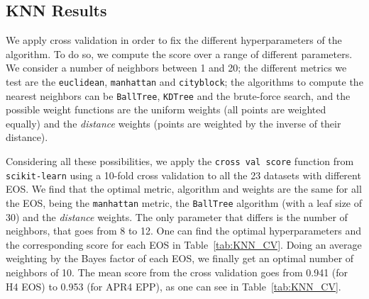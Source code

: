 \subsection{KNN Results}

We apply cross validation in order to fix the different hyperparameters of the algorithm.  To do so, we compute the score over a range of different parameters. We consider a number of neighbors between 1 and 20; the different metrics we test are the \texttt{euclidean}, \texttt{manhattan} and \texttt{cityblock}; the algorithms to compute the nearest neighbors can be \texttt{BallTree}, \texttt{KDTree} and the brute-force search, and the possible weight functions are the uniform weights (all points are weighted equally) and the \textit{distance} weights (points are weighted by the inverse of their distance). 

Considering all these possibilities, we apply the \texttt{cross val score} function from \texttt{scikit-learn} using a 10-fold cross validation to all the 23 datasets with different EOS.  We find that the optimal metric, algorithm and weights are the same for all the EOS, being the  \texttt{manhattan} metric, the \texttt{BallTree} algorithm (with a leaf size of 30) and the \textit{distance} weights. The only parameter that differs is the number of neighbors, that goes from 8 to 12. One can find the optimal hyperparameters and the corresponding score for each EOS in Table~\ref{tab:KNN_CV}. Doing an average weighting by the Bayes factor of each EOS, we finally get an optimal number of neighbors of 10. The mean score from the cross validation goes from 0.941 (for H4 EOS) to 0.953 (for APR4 EPP), as one can see in Table~\ref{tab:KNN_CV}.  

